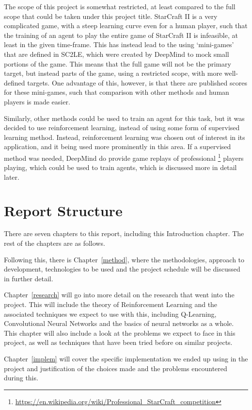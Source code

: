 The scope of this project is somewhat restricted, at least compared to the full
scope that could be taken under this project title. StarCraft II is a very
complicated game, with a steep learning curve even for a human player, such that
the training of an agent to play the entire game of StarCraft II is infeasible,
at least in the given time-frame. This has instead lead to the using
`mini-games' that are defined in SC2LE, which were created by DeepMind to mock
small portions of the game. This means that the full game will not be the
primary target, but instead parts of the game, using a restricted scope, with
more well-defined targets.  One advantage of this, however, is that there are
published scores for these mini-games, such that comparison with other methods
and human players is made easier.

Similarly, other methods could be used to train an agent for this task, but it
was decided to use reinforcement learning, instead of using some form of
supervised learning method. Instead, reinforcement learning was chosen out of
interest in its application, and it being used more prominently in this area.
If a supervised method was needed, DeepMind do provide game replays of
professional%
\footnote{\url{https://en.wikipedia.org/wiki/Professional_StarCraft_competition}}
players playing, which could be used to train agents, which is discussed more in
detail later.

\section{Report Structure}

There are seven chapters to this report, including this Introduction chapter.
The rest of the chapters are as follows.

Following this, there is Chapter~\ref{method}, where the methodologies, approach
to development, technologies to be used and the project schedule will be
discussed in further detail.

Chapter~\ref{research} will go into more detail on the research that went into
the project. This will include the theory of Reinforcement Learning and the
associated techniques we expect to use with this, including Q-Learning,
Convolutional Neural Networks and the basics of neural networks as a whole. This
chapter will also include a look at the problems we expect to face in this
project, as well as techniques that have been tried before on similar projects.

Chapter~\ref{implem} will cover the specific implementation we ended up using in
the project and justification of the choices made and the problems encountered
during this.

